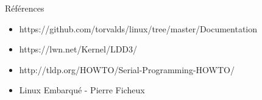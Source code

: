 \documentclass[12pt, t]{beamer}
\newcommand{\bi}{\begin{itemize}}
\newcommand{\ei}{\end{itemize}}
\begin{document}
\begin{frame}{Références}
    \vspace{30pt}

    \bi
    \itemsep12pt
    \item https://github.com/torvalds/linux/tree/master/Documentation
    \item https://lwn.net/Kernel/LDD3/
    \item http://tldp.org/HOWTO/Serial-Programming-HOWTO/
    \item Linux Embarqué - Pierre Ficheux
    \ei

\end{frame}
\end{document}
